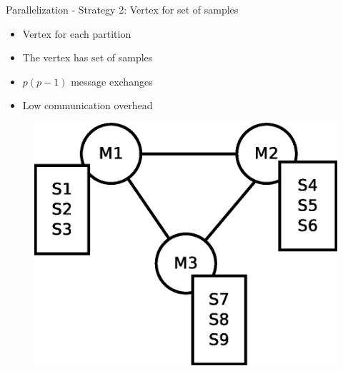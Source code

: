 \documentclass{beamer}
\begin{document}
\begin{frame}{Parallelization - Strategy 2: Vertex for set of samples}

\begin{itemize}
\item Vertex for each partition 
\item The vertex has set of samples
\item $p(p-1)$ message exchanges
\item Low communication overhead
\end{itemize}

\begin{figure}[!htb]
  \centering
  \includegraphics[scale=0.30]{graph2.eps}
  \label{fig:vss:graph2}
\end{figure}

\end{frame}

\end{document}
